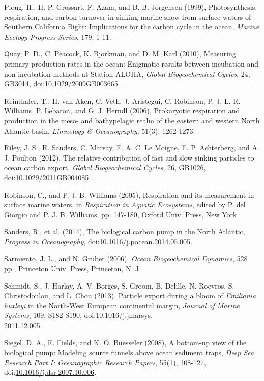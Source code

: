 \begin{singlespace}
{{Ploug, H., H.-P. Grossart, F. Azam, and B. B. Jorgensen (1999), Photosynthesis, respiration, and carbon turnover in sinking marine snow from surface waters of Southern California Bight: Implications for the carbon cycle in the ocean, \emph{Marine Ecology Progress Series}, 179, 1-11.

Quay, P. D., C. Peacock, K. Bj\"{o}rkman, and D. M. Karl (2010), Measuring primary production rates in the ocean: Enigmatic results between incubation and non-incubation methods at Station ALOHA, \emph{Global Biogeochemical Cycles}, 24, GB3014, doi:\href{http://dx.doi.org/10.1029/2009GB003665}{10.1029/2009GB003665}.

Reinthaler, T., H. van Aken, C. Veth, J. Aristegui, C. Robinson, P. J. L. R. Williams, P. Lebaron, and G. J. Herndl (2006), Prokaryotic respiration and production in the meso- and bathypelagic realm of the eastern and western North Atlantic basin, \emph{Limnology \& Oceanography}, 51(3), 1262-1273.

Riley, J. S., R. Sanders, C. Marsay, F. A. C. Le Moigne, E. P. Achterberg, and A. J. Poulton (2012), The relative contribution of fast and slow sinking particles to ocean carbon export, \emph{Global Biogeochemical Cycles}, 26, GB1026, doi:\href{http://dx.doi.org/10.1029/2011GB004085}{10.1029/2011GB004085}.

Robinson, C., and P. J. B. Williams (2005), Respiration and its measurement in surface marine waters, in \emph{Respiration in Aquatic Ecosystems}, edited by P. del Giorgio and P. J. B. Williams, pp. 147-180, Oxford Univ. Press, New York.

Sanders, R., et al. (2014), The biological carbon pump in the North Atlantic, \emph{Progress in Oceanography}, doi:\href{http://dx.doi.org/10.1016/j.pocean.2014.05.005}{10.1016/j.pocean.2014.05.005}.

Sarmiento, J. L., and N. Gruber (2006), \emph{Ocean Biogeochemical Dynamics}, 528 pp., Princeton Univ. Press, Princeton, N. J.

Schmidt, S., J. Harlay, A. V. Borges, S. Groom, B. Delille, N. Roevros, S. Christodoulou, and L. Chou (2013), Particle export during a bloom of \emph{Emiliania huxleyi} in the North-West European continental margin, \emph{Journal of Marine Systems}, 109, S182-S190, doi:\href{http://dx.doi.org/10.1016/j.jmarsys.2011.12.005}{10.1016/j.jmarsys.\\2011.12.005}.

Siegel, D. A., E. Fields, and K. O. Buesseler (2008), A bottom-up view of the biological pump: Modeling source funnels above ocean sediment traps, \emph{Deep Sea Research Part I: Oceanographic Research Papers}, 55(1), 108-127, doi:\href{http://dx.doi.org/10.1016/j.dsr.2007.10.006}{10.1016/j.dsr.2007.10.006}.

}}
\end{singlespace}
